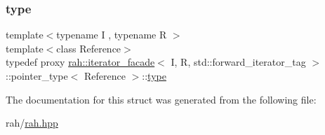\subsubsection{\texorpdfstring{type}{type}}
{\footnotesize\ttfamily template$<$typename I , typename R $>$ \\
template$<$class Reference$>$ \\
typedef proxy \mbox{\hyperlink{structrah_1_1iterator__facade}{rah\+::iterator\+\_\+facade}}$<$ I, R, std\+::forward\+\_\+iterator\+\_\+tag $>$\+::pointer\+\_\+type$<$ Reference $>$\+::\mbox{\hyperlink{structrah_1_1iterator__facade_3_01_i_00_01_r_00_01std_1_1forward__iterator__tag_01_4_1_1pointer__type_a2289999abe125951a510673b21746a0d}{type}}}



The documentation for this struct was generated from the following file\+:\begin{DoxyCompactItemize}
\item 
rah/\mbox{\hyperlink{rah_8hpp}{rah.\+hpp}}\end{DoxyCompactItemize}
